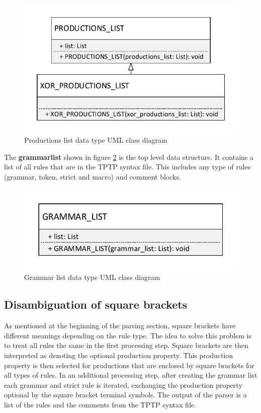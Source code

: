 \begin{figure}[H]
\centering
\includegraphics[width=.6\textwidth]{images/Concept_uml_data_types_productions_list.pdf}
\caption{Productions list data type UML class diagram}
\label{fig:ConceptProductionsListClassDiagram}
\end{figure}


The \textbf{grammar\textunderscore list} shown in figure \ref{fig:ConceptGrammarListClassDiagram} is the top level data structure. It contains a list of all rules that are in the TPTP syntax file.
This includes any type of rules (grammar, token, strict and macro) and comment blocks. 

\begin{figure}[H]
\centering
\includegraphics[width=.5\textwidth]{images/Concept_uml_data_types_grammar_list.pdf}
\caption{Grammar list data type UML class diagram}
\label{fig:ConceptGrammarListClassDiagram}
\end{figure}

\subsection{Disambiguation of  square brackets}\label{sec:ConceptDisambiguation}
As mentioned at the beginning of the parsing section, square brackets have different meanings depending on the rule type.
The idea to solve this problem is to treat all rules the same in the first processing step.
Square brackets are then interpreted as denoting the optional production property.
This production property is then selected for productions that are enclosed by square brackets for all types of rules.
In an additional processing step, after creating the grammar list each grammar and strict rule is iterated, exchanging the production property optional by the square bracket terminal symbols.
The output of the parser is a list of the rules and the comments from the \ac{TPTP} syntax file.

